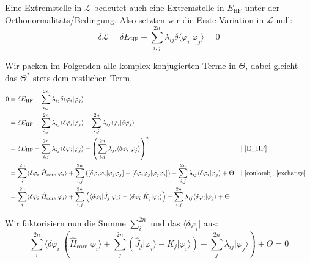 Eine Extremstelle in $\mathcal{L}$ bedeutet auch eine Extremstelle in $E_\textrm{HF}$
unter der Orthonormalitäts\-/Bedingung. Also setzten wir die Erste Variation in $\mathcal{L}$ null:
\begin{equation}
  \delta \mathcal{L} = \delta E_\textrm{HF}
  - \sum^{2n}_{i,j} \lambda_{ij} \delta \langle \varphi_i \vert \varphi_j \rangle = 0
\end{equation}

Wir packen im Folgenden alle komplex konjugierten Terme in $\Theta$,
dabei gleicht das $\Theta^*$ stets dem restlichen Term.
\begin{align*}
  0 &= \delta E_\textrm{HF} 
  - \sum^{2n}_{i,j} \lambda_{ij} \delta \langle \varphi_i \vert \varphi_j \rangle\\
  &= \delta E_\textrm{HF}
  - \sum^{2n}_{i,j} \lambda_{ij} \langle \delta \varphi_i \vert \varphi_j \rangle
  - \sum^{2n}_{i,j} \lambda_{ij} \langle \varphi_i \vert \delta \varphi_j \rangle\\
  &= \delta E_\textrm{HF}
  - \sum^{2n}_{i,j} \lambda_{ij} \langle \delta \varphi_i \vert \varphi_j \rangle
  - \left(\sum^{2n}_{i,j} \lambda_{ji} \langle \delta \varphi_i \vert \varphi_j \rangle \right)^*
  &| &\textrm{ \cref{E_HF}}\\
  &=  \sum_i^{2n} \langle \delta \varphi_i \vert \hat{H}_{\text{core}} \vert \varphi_i \rangle
  + \sum_{i, j}^{2n} \left( 
    \left[ \delta \varphi_i \varphi_i \vert \varphi_j\varphi_j \right] 
    - \left[ \delta \varphi_i\varphi_j \vert \varphi_j\varphi_i \right]
  \right) 
  - \sum_{i,j}^{2n} \lambda_{ij} \langle \delta \varphi_i \vert \varphi_j \rangle + \Theta
  &| &\textrm{ \cref{coulomb}, \cref{exchange}}\\
  &=  \sum_i^{2n} \langle \delta \varphi_i \vert \hat{H}_{\text{core}} \vert \varphi_i \rangle
  + \sum_{i, j}^{2n} \left( 
    \langle \delta \varphi_i \vert \hat{J}_j \vert \varphi_i \rangle
    - \langle \delta \varphi_i \vert \hat{K}_j \vert \varphi_i \rangle
  \right) 
  - \sum_{i,j}^{2n} \lambda_{ij} \langle \delta \varphi_i \vert \varphi_j \rangle + \Theta
\end{align*}

Wir faktorisiern nun die Summe $\sum_i^{2n}$ und das $\langle \delta \varphi_i \vert$ aus:
\begin{equation*}
  \sum_i^{2n} \langle \delta \varphi_i \vert \left(
    \hat{H}_{\text{core}} \vert \varphi_i \rangle
  + \sum_j^{2n} \left(
    \hat{J}_j \vert \varphi_i \rangle
    - \hat{K}_j \vert \varphi_i \rangle
  \right) 
  - \sum_j^{2n}\lambda_{ij} \vert \varphi_j \rangle \right) + \Theta
  = 0
\end{equation*}

